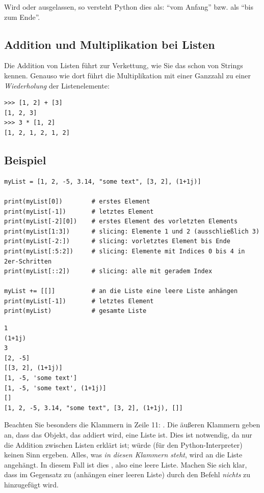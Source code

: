 Wird  oder  ausgelassen, so versteht Python dies als: \enquote{vom Anfang} bzw. als \enquote{bis zum Ende}.

\subsection{Addition und Multiplikation bei Listen}
Die Addition von Listen führt zur Verkettung, wie Sie das schon von Strings kennen. Genauso wie dort führt die Multiplikation mit einer Ganzzahl zu einer \emph{Wiederholung} der Listenelemente:
\begin{cmdbox}
\begin{verbatim}
>>> [1, 2] + [3]
[1, 2, 3]
>>> 3 * [1, 2]
[1, 2, 1, 2, 1, 2]
\end{verbatim}
\end{cmdbox}

\subsection{Beispiel}
\begin{codebox}
\begin{verbatim}
myList = [1, 2, -5, 3.14, "some text", [3, 2], (1+1j)]

print(myList[0])        # erstes Element
print(myList[-1])       # letztes Element
print(myList[-2][0])    # erstes Element des vorletzten Elements
print(myList[1:3])      # slicing: Elemente 1 und 2 (ausschließlich 3)
print(myList[-2:])      # slicing: vorletztes Element bis Ende
print(myList[:5:2])     # slicing: Elemente mit Indices 0 bis 4 in 2er-Schritten
print(myList[::2])      # slicing: alle mit geradem Index

myList += [[]]          # an die Liste eine leere Liste anhängen
print(myList[-1])       # letztes Element
print(myList)           # gesamte Liste
\end{verbatim}
\end{codebox}

\begin{cmdbox}[Ausgabe]
\begin{verbatim}
1
(1+1j)
3
[2, -5]
[[3, 2], (1+1j)]
[1, -5, 'some text']
[1, -5, 'some text', (1+1j)]
[]
[1, 2, -5, 3.14, "some text", [3, 2], (1+1j), []]
\end{verbatim}
\end{cmdbox}
Beachten Sie besonders die Klammern in Zeile 11: . Die äußeren Klammern geben an, dass das Objekt, das addiert wird, eine Liste ist. Dies ist notwendig, da nur die Addition zwischen Listen erklärt ist;  würde (für den Python-Interpreter) keinen Sinn ergeben. Alles, was \emph{in diesen Klammern steht}, wird an die Liste angehängt. In diesem Fall ist dies \inPy{[]}, also eine leere Liste. Machen Sie sich klar, dass im Gegensatz zu  (anhängen einer leeren Liste) durch den Befehl  \emph{nichts} zu  hinzugefügt wird.

